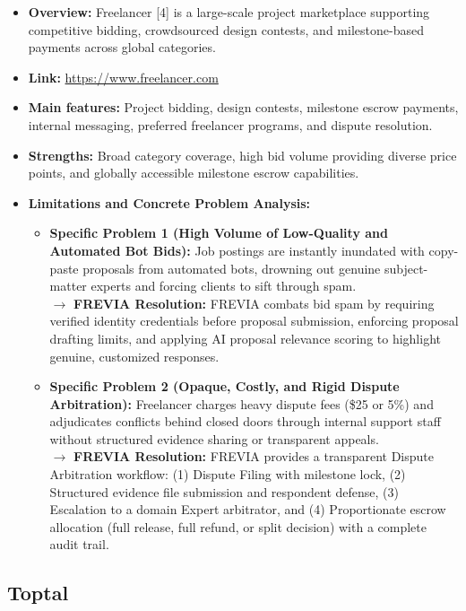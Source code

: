 \begin{itemize}[leftmargin=*]
\item \textbf{Overview:} Freelancer [4] is a large-scale project marketplace supporting competitive bidding, crowdsourced design contests, and milestone-based payments across global categories.
\item \textbf{Link:} \url{https://www.freelancer.com}
\item \textbf{Main features:} Project bidding, design contests, milestone escrow payments, internal messaging, preferred freelancer programs, and dispute resolution.
\item \textbf{Strengths:} Broad category coverage, high bid volume providing diverse price points, and globally accessible milestone escrow capabilities.
\item \textbf{Limitations and Concrete Problem Analysis:}
    \begin{itemize}[leftmargin=*]
        \item \textbf{Specific Problem 1 (High Volume of Low-Quality and Automated Bot Bids):} Job postings are instantly inundated with copy-paste proposals from automated bots, drowning out genuine subject-matter experts and forcing clients to sift through spam.\\
        $\rightarrow$ \textbf{FREVIA Resolution:} FREVIA combats bid spam by requiring verified identity credentials before proposal submission, enforcing proposal drafting limits, and applying AI proposal relevance scoring to highlight genuine, customized responses.
        \item \textbf{Specific Problem 2 (Opaque, Costly, and Rigid Dispute Arbitration):} Freelancer charges heavy dispute fees (\$25 or 5\%) and adjudicates conflicts behind closed doors through internal support staff without structured evidence sharing or transparent appeals.\\
        $\rightarrow$ \textbf{FREVIA Resolution:} FREVIA provides a transparent Dispute Arbitration workflow: (1) Dispute Filing with milestone lock, (2) Structured evidence file submission and respondent defense, (3) Escalation to a domain Expert arbitrator, and (4) Proportionate escrow allocation (full release, full refund, or split decision) with a complete audit trail.
    \end{itemize}
\end{itemize}

\subsection{Toptal}

